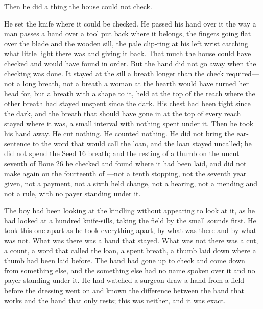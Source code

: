 Then he did a thing the house could not check.

He set the knife where it could be checked. He passed his hand over it the way a man passes a hand over a tool put back where it belongs, the fingers going flat over the blade and the wooden sill, the pale clip-ring at his left wrist catching what little light there was and giving it back. That much the house could have checked and would have found in order. But the hand did not go away when the checking was done. It stayed at the sill a breath longer than the check required---not a long breath, not a breath a woman at the hearth would have turned her head for, but a breath with a shape to it, held at the top of the reach where the other breath had stayed unspent since the dark. His chest had been tight since the dark, and the breath that should have gone in at the top of every reach stayed where it was, a small interval with nothing spent under it. Then he took his hand away. He cut nothing. He counted nothing. He did not bring the ear-sentence to the word that would call the loan, and the loan stayed uncalled; he did not spend the Seed 16 breath; and the resting of a thumb on the uncut seventh of Bone 26 he checked and found where it had been laid, and did not make again on the fourteenth of ---not a tenth stopping, not the seventh year given, not a payment, not a sixth held change, not a hearing, not a mending and not a rule, with no payer standing under it.

The boy had been looking at the kindling without appearing to look at it, as he had looked at a hundred knife-sills, taking the field by the small sounds first. He took this one apart as he took everything apart, by what was there and by what was not. What was there was a hand that stayed. What was not there was a cut, a count, a word that called the loan, a spent breath, a thumb laid down where a thumb had been laid before. The hand had gone up to check and come down from something else, and the something else had no name spoken over it and no payer standing under it. He had watched a surgeon draw a hand from a field before the dressing went on and known the difference between the hand that works and the hand that only rests; this was neither, and it was exact.

